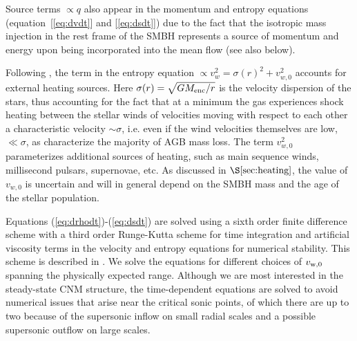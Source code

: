 \documentclass[usenatbib,fleqn]{mn2e}
\newcommand{\vw}{v_w}
\begin{document}
Source terms $\propto q$ also appear in the momentum and entropy
equations (equation~[\ref{eq:dvdt}] and [\ref{eq:dsdt}]) due to the fact
that the isotropic mass injection in the rest frame of the SMBH
represents a source of momentum and energy upon being incorporated
into the mean flow (see also below).  


Following \citet{ShcherbakovWong+:2014a}, the term in the entropy
equation $\propto \vw^2 = \sigma(r)^2+v_{w,0}^2$ accounts for external
heating sources.  Here $\sigma(r) = \sqrt{GM_{\rm enc}/r}$ is the
velocity dispersion of the stars, thus accounting for the fact that at
a minimum the gas experiences shock heating between the stellar winds
of velocities moving with respect to each other a characteristic
velocity $\sim \sigma$, i.e. even if the wind velocities themselves
are low, $\ll \sigma$, as characterize the majority of AGB mass loss.
The term $v_{w,0}^{2}$ parameterizes additional sources of heating,
such as main sequence winds, millisecond pulsars, supernovae, etc.  As
discussed in $\S\ref{sec:heating}$, the value of $v_{w,0}$ is
uncertain and will in general depend on the SMBH mass and the age of
the stellar population.

Equations (\ref{eq:drhodt})-(\ref{eq:dsdt}) are solved using a sixth
order finite difference scheme with a third order Runge-Kutta scheme
for time integration and artificial viscosity terms in the velocity
and entropy equations for numerical stability. This scheme is
described in \cite{Brandenburg:2003a}.  We solve the equations for
different choices of $v_{\rm w,0}$ spanning the physically expected
range.  Although we are most interested in the steady-state CNM
structure, the time-dependent equations are solved to avoid numerical
issues that arise near the critical sonic points, of which there are
up to two because of the supersonic inflow on small radial scales and
a possible supersonic outflow on large scales.
\end{document}
